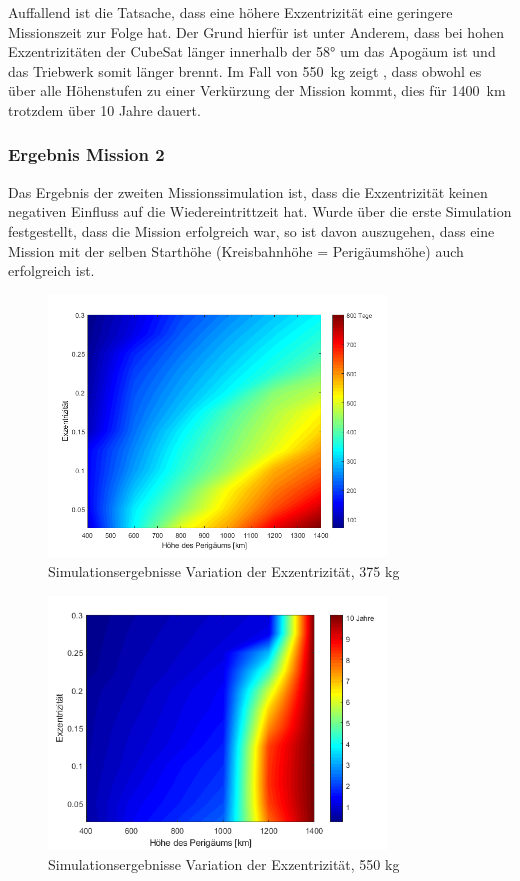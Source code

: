 	Auffallend ist die Tatsache, dass eine höhere Exzentrizität eine geringere Missionszeit zur Folge hat. Der Grund hierfür ist unter Anderem, dass bei hohen Exzentrizitäten der CubeSat länger innerhalb der \num{58}° um das Apogäum ist und das Triebwerk somit länger brennt. Im Fall von \SI{550}{\kilogram} zeigt , dass obwohl es über alle Höhenstufen zu einer Verkürzung der Mission kommt, dies für \SI{1400}{\kilo\metre} trotzdem über \num{10} Jahre dauert. 
	
\subsubsection{Ergebnis Mission 2}

Das Ergebnis der zweiten Missionssimulation ist, dass die Exzentrizität keinen negativen Einfluss auf die Wiedereintrittzeit hat. Wurde über die erste Simulation festgestellt, dass die Mission erfolgreich war, so ist davon auszugehen, dass eine Mission mit der selben Starthöhe (Kreisbahnhöhe = Perigäumshöhe) auch erfolgreich ist.

	
	\begin{figure}[t]
	\centering
		\includegraphics[width=0.80\textwidth]{./graphics/GMAT/ecc_perigee_375kg.png}
		\caption{Simulationsergebnisse Variation der Exzentrizität, 375 kg}
	\label{fig:GMAT_ecc_b}
\end{figure}

\begin{figure}[H]
	\centering
		\includegraphics[width=0.80\textwidth]{./graphics/GMAT/ecc_perigee_550kg.png}
		\caption{Simulationsergebnisse Variation der Exzentrizität, 550 kg}
	\label{fig:GMAT_ecc_c}
\end{figure}


